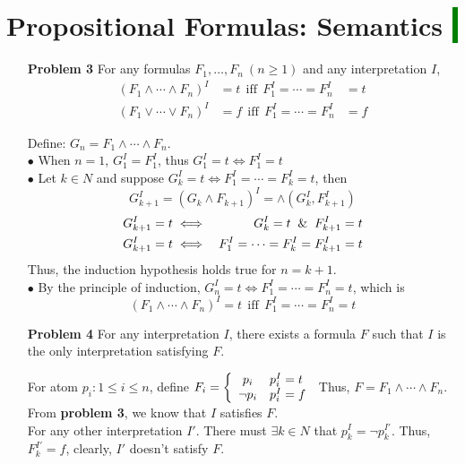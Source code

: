 \documentclass[12pt]{article}
\begin{document}
\section*{Propositional Formulas: Semantics \colorbox{green}{$~$ }}
\begin{enumerate}
\item[\textbf{Problem 3}] For any formulas $F_1, \ldots, F_n~(n \geq 1)$ and any interpretation $I$, 
\begin{eqnarray*}
 (F_1 \wedge \cdots \wedge F_n)^I &= t~~ \text{iff} ~~ F_1^I = \cdots = F_n^I &= t  \\
 (F_1 \vee \cdots \vee F_n)^I &= f~~ \text{iff} ~~ F_1^I = \cdots = F_n^I &= f 
\end{eqnarray*}

\noindent
Define: $G_n = F_1 \wedge \cdots \wedge F_n$. \\
$\bullet$ When $n = 1$, $G_1^I = F_1^I$, thus $G_1^I = t \iff F_1^I = t$  \\
$\bullet$ Let $k \in N$ and suppose $G_k^I = t \iff F_1^I = \cdots = F_k^I = t$, then
\begin{equation*}
    G_{k+1}^I = \left(G_k \wedge F_{k+1} \right)^I = \wedge \left(G_k^I, F_{k+1}^I \right)
\end{equation*}
\vspace{-30pt}
\begin{eqnarray*}
    G_{k+1}^I = t &\iff &G_k^I = t \And F_{k+1}^I = t  \\
    G_{k+1}^I = t &\iff & F_1^I = \cdots = F_k^I = F_{k+1}^I = t
\end{eqnarray*}
\hspace{10pt}Thus, the induction hypothesis holds true for $n = k+1$. \\
$\bullet$ By the principle of induction, $G_n^I = t \iff F_1^I = \cdots = F_n^I = t$, which is \\
\begin{equation*}
(F_1 \wedge \cdots \wedge F_n)^I = t~~ \text{iff} ~~ F_1^I = \cdots = F_n^I = t
\end{equation*}

\item[\textbf{Problem 4}] For any interpretation $I$, there exists a formula $F$ such that $I$ is the only interpretation satisfying $F$. 

For atom $p_i : 1 \leq i \leq n$, define 
$F_i=\left\{
    \begin{array}{c l}      
    p_i & p_i^I = t\\
    \neg p_i & p_i^I = f
\end{array}\right.$
Thus, $F = F_1 \wedge \cdots \wedge F_n$. \\
From \textbf{problem 3}, we know that $I$ satisfies $F$. \\
For any other interpretation $I'$. There must $\exists k \in N$ that $p_k^{I} = \neg p_k^{I'}$. Thus, $F_k^{I'} = f$, clearly, $I'$ doesn't satisfy $F$. 



\end{enumerate}
\end{document}
